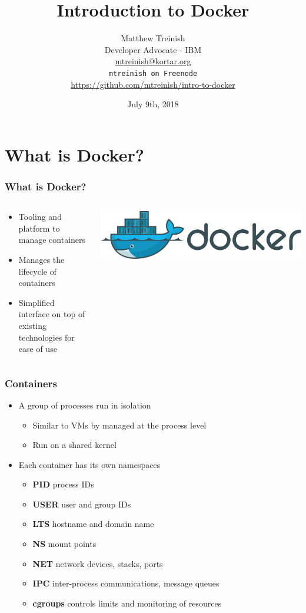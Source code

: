 \documentclass[aspectratio=169,11pt,hyperref={colorlinks=true}]{beamer}
\author[Matthew Treinish]{%
    \texorpdfstring{%
        \centering
        Matthew Treinish\\
        Developer Advocate - IBM \\
        \href{mailto:mtreinish@kortar.org}{mtreinish@kortar.org}\\
        \texttt{mtreinish on Freenode}\\
        \href{https://github.com/mtreinish/intro-to-docker}{https://github.com/mtreinish/intro-to-docker}
   }
   {Matthew Treinish}
}
\date{July 9th, 2018}
\title{Introduction to Docker}
\begin{document}
\titlepage

\section{What is Docker?}
\begin{frame}
    \frametitle{What is Docker?}
    \begin{columns}[T]
        \begin{column}{.48\textwidth}
            \begin{itemize}
                \item Tooling and platform to manage containers
                \item Manages the lifecycle of containers
                \item Simplified interface on top of existing technologies for ease of use
            \end{itemize}
        \end{column}
        \begin{column}{.48\textwidth}
            \includegraphics[width=.9\textwidth]{Docker_logo.png}
        \end{column} 
    \end{columns}
\end{frame}

\begin{frame}
    \frametitle{Containers}
    \begin{itemize}
    \item A group of processes run in isolation
        \begin{itemize}
            \item Similar to VMs by managed at the process level
            \item Run on a shared kernel
        \end{itemize}
    \item Each container has its own namespaces
        \begin{itemize}
            \item \textbf{PID} process IDs
            \item \textbf{USER} user and group IDs
            \item \textbf{LTS} hostname and domain name
            \item \textbf{NS} mount points
            \item \textbf{NET} network devices, stacks, ports
            \item \textbf{IPC} inter-process communications, message queues
            \item \textbf{cgroups} controls limits and monitoring of resources
        \end{itemize}
    \end{itemize}
\end{frame}
\end{document}

